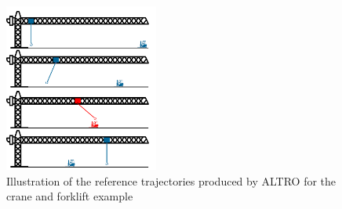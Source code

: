\begin{figure}[t]
	\centering
	\includegraphics[width=0.45\textwidth]{figures/crane_and_lifter.png}
	\caption{Illustration of the reference trajectories produced by ALTRO for the crane and forklift example}
\end{figure}\label{fig:cr_and_lft}


